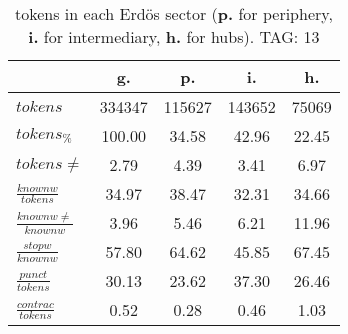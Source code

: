 \begin{table}[h!]
\begin{center}
\begin{tabular}{| l || c | c | c | c |}\hline
 & {\bf g.} & {\bf p.} & {\bf i.} & {\bf h.} \\\hline\hline
$tokens$ & 334347  & 115627  & 143652  & 75069 \\
$tokens_{\%}$ & 100.00  & 34.58  & 42.96  & 22.45 \\
$tokens \neq$ & 2.79  & 4.39  & 3.41  & 6.97 \\\hline
$\frac{knownw}{tokens}$ & 34.97  & 38.47  & 32.31  & 34.66 \\
$\frac{knownw \neq}{knownw}$ & 3.96  & 5.46  & 6.21  & 11.96 \\\hline
$\frac{stopw}{knownw}$ & 57.80  & 64.62  & 45.85  & 67.45 \\
$\frac{punct}{tokens}$ & 30.13  & 23.62  & 37.30  & 26.46 \\
$\frac{contrac}{tokens}$ & 0.52  & 0.28  & 0.46  & 1.03 \\\hline
\end{tabular}
\caption{tokens in each Erd\"os sector ({{\bf p.}} for periphery, {{\bf i.}} for intermediary, 
    {{\bf h.}} for hubs). TAG: 13}
\end{center}
\end{table}